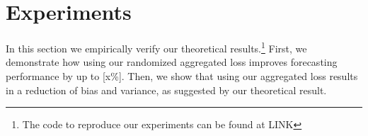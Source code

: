 \documentclass[preprint, 3p, times, twocolumn]{elsarticle}
\begin{document}

















\section{Experiments}
  \label{sec:experiments}
  In this section we empirically verify our theoretical results.\footnote{The code to reproduce our experiments can be found at LINK} First, we demonstrate how using our randomized aggregated loss improves forecasting performance by up to [x\%]. Then, we show that using our aggregated loss results in a reduction of bias and variance, as suggested by our theoretical result.
\end{document}
